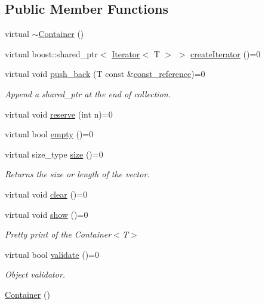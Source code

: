 \subsection*{Public Member Functions}
\begin{DoxyCompactItemize}
\item 
virtual \hyperlink{class_container_a5b3440c3177017d2d6a190724e7078ec}{$\sim$Container} ()
\item 
virtual boost::shared\_\-ptr$<$ \hyperlink{class_iterator}{Iterator}$<$ T $>$ $>$ \hyperlink{class_container_a1cfd60c48bf7ac7d0c6e323c8fa3d1da}{createIterator} ()=0
\item 
virtual void \hyperlink{class_container_adc177ce7c428ded8788bc66fb829db8b}{push\_\-back} (T const \&\hyperlink{class_container_a8dd7ae9d0687e11d873f98206e961ac1}{const\_\-reference})=0
\begin{DoxyCompactList}\small\item\em Append a shared\_\-ptr at the end of collection. \end{DoxyCompactList}\item 
virtual void \hyperlink{class_container_a39dd135ff6d4ba1bb3785100e266a748}{reserve} (int n)=0
\item 
virtual bool \hyperlink{class_container_aeb0ba9c87519ae6b7036d72589948755}{empty} ()=0
\item 
virtual size\_\-type \hyperlink{class_container_a359f34bc418575b474184cbe3f33527e}{size} ()=0
\begin{DoxyCompactList}\small\item\em Returns the size or length of the vector. \end{DoxyCompactList}\item 
virtual void \hyperlink{class_container_a3c98faf8d85775ce5deb9db00fc11b18}{clear} ()=0
\item 
virtual void \hyperlink{class_container_ada156e5601bc75549e64ea4befb136f0}{show} ()=0
\begin{DoxyCompactList}\small\item\em Pretty print of the Container$<$T$>$ \end{DoxyCompactList}\item 
virtual bool \hyperlink{class_container_acfdc5456a2fc854d1830a8a351567928}{validate} ()=0
\begin{DoxyCompactList}\small\item\em Object validator. \end{DoxyCompactList}\item 
\hyperlink{class_container_ab17ce1f67243b28abcd4c8113a72524c}{Container} ()

\end{DoxyCompactItemize}
